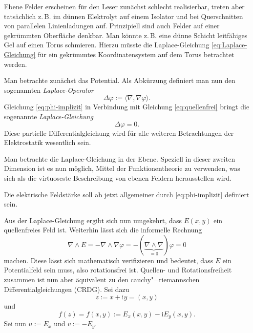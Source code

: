 \documentclass[a4paper,10pt,fleqn,twocolumn,twoside,dvipdfmx]{scrartcl}
\newcommand{\ui}{\mathrm i}
\begin{document}
Ebene Felder erscheinen für den Leser zunächst schlecht realisierbar,
treten aber tatsächlich z.\,B. im dünnen Elektrolyt auf einem
Isolator und bei Querschnitten von parallelen Linienladungen auf.
Prinzipiell sind auch Felder auf einer gekrümmten Oberfläche
denkbar. Man könnte z.\,B. eine dünne Schicht leitfähiges Gel
auf einen Torus schmieren. Hierzu müsste die Laplace-Gleichung
\eqref{eq:Laplace-Gleichung} für ein gekrümmtes Koordinatensystem
auf dem Torus betrachtet werden.

Man betrachte zunächst das Potential.
Als Abkürzung definiert man nun den sogenannten \emph{Laplace-Operator}%
\begin{equation}
\Delta\varphi := \langle\nabla,\nabla\varphi\rangle.
\end{equation}
Gleichung
\eqref{eq:phi-implizit} in Verbindung mit Gleichung
\eqref{eq:quellenfrei} bringt die sogenannte \emph{Laplace-Gleichung}%
\begin{equation}\label{eq:Laplace-Gleichung}
\Delta\varphi = 0.
\end{equation}
Diese partielle Differentialgleichung wird für alle weiteren
Betrachtungen der Elektrostatik wesentlich sein.

Man betrachte die Laplace-Gleichung in der Ebene.
Speziell in dieser zweiten Dimension ist es nun möglich,
Mittel der Funktionentheorie zu verwenden,
was sich als die virtuoseste Beschreibung von ebenen Feldern
herausstellen wird.

Die elektrische Feldstärke soll ab jetzt allgemeiner durch
\eqref{eq:phi-implizit} definiert sein.

Aus der Laplace-Gleichung ergibt sich nun umgekehrt, dass $E(x,y)$
ein quellenfreies Feld ist. Weiterhin lässt sich die
informelle Rechnung%
\begin{equation}
\nabla\wedge E
= -\nabla\wedge\nabla\varphi
= -(\underbrace{\nabla\wedge\nabla}_{=0})\varphi =0
\end{equation}
machen. Diese lässt sich mathematisch verifizieren und bedeutet,
dass $E$ ein Potentialfeld sein muss, also rotationsfrei ist.
Quellen- und Rotationsfreiheit zusammen ist nun aber
äquivalent zu den cauchy"=riemannschen Differentialgleichungen
(CRDG). Sei dazu%
\begin{equation}
z:=x+\ui y=(x,y)
\end{equation}
und
\begin{equation}
f(z)=f(x,y):=E_x(x,y)-\mathrm{i}E_y(x,y).
\end{equation}
Sei nun $u:=E_x$ und $v:=-E_y$.
\end{document}
